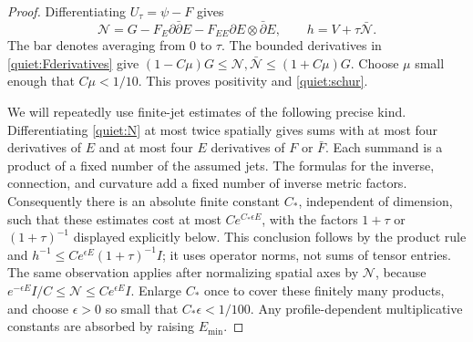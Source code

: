 \begin{proof}
Differentiating \(U_\tau=\psi-F\) gives
\begin{equation}\label{quiet:N}
 \mathcal N=G-F_E\partial\bar\partial E
               -F_{EE}\partial E\otimes\bar\partial E,
 \qquad h=V+\tau\bar{\mathcal N}.
\end{equation}
The bar denotes averaging from 0 to \(\tau\).  The bounded derivatives
in \eqref{quiet:Fderivatives} give
\((1-C\mu)G\le\mathcal N,\bar{\mathcal N}\le(1+C\mu)G\).
Choose \(\mu\) small enough that \(C\mu<1/10\).  This proves
positivity and \eqref{quiet:schur}.

We will repeatedly use finite-jet estimates of the following precise
kind.  Differentiating \eqref{quiet:N} at most twice spatially gives
sums with at most four derivatives of \(E\) and at most four \(E\) derivatives
of \(F\) or \(\bar F\).  Each summand is a product of a fixed number of
the assumed jets.  The formulas for the inverse, connection, and
curvature add a fixed number of inverse metric factors.  Consequently
there is an absolute finite constant \(C_*\), independent of dimension,
such that these estimates cost at most \(C e^{C_*\epsilon E}\), with
the factors \(1+\tau\) or \((1+\tau)^{-1}\) displayed explicitly
below.  This conclusion follows by the product rule and
\(h^{-1}\le C e^{\epsilon E}(1+\tau)^{-1}I\); it uses operator norms,
not sums of tensor entries.  The same observation applies after
normalizing spatial axes by \(\mathcal N\), because
\(e^{-\epsilon E}I/C\le\mathcal N\le C e^{\epsilon E}I\).
Enlarge \(C_*\) once to cover these finitely many products, and choose
\(\epsilon>0\) so small that \(C_*\epsilon<1/100\).
Any profile-dependent multiplicative constants are absorbed by raising
\(E_{\min}\).


\end{proof}
